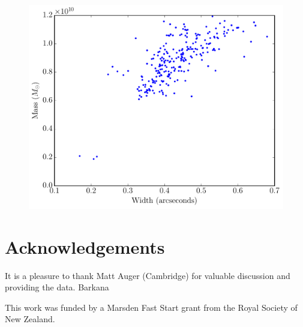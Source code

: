 \documentclass[useAMS,usenatbib]{mn2e}
\begin{document}
\begin{figure}
\centering
\includegraphics[scale=0.45]{mass_width.pdf}
\caption{\label{fig:mass_width}}
\end{figure}



\section*{Acknowledgements}
It is a pleasure to thank Matt Auger (Cambridge) for valuable discussion and
providing the data. Barkana

This work was funded by a Marsden Fast Start grant from the Royal Society of
New Zealand.


\begin{thebibliography}{99}
\end{thebibliography}
\end{document}
